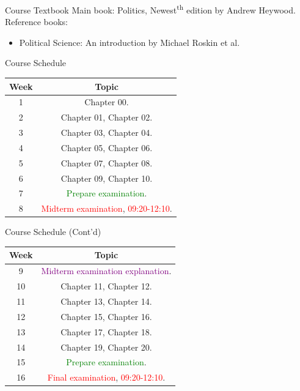 \documentclass{beamer}
\begin{document}
\begin{frame}{Course Textbook}
Main book: Politics, Newest\textsuperscript{th} edition by Andrew Heywood. \\
Reference books:
\begin{itemize}
\item Political Science: An introduction by Michael Roskin et al.
\end{itemize}
\end{frame}
\begin{frame}{Course Schedule}
\begin{center}
\begin{tabular}{|c|c|}
\hline
Week & Topic \\
\hline
1 & Chapter 00.\\
\hline
2 & Chapter 01, Chapter 02.\\
\hline
3 & Chapter 03, Chapter 04.\\
\hline
4 & Chapter 05, Chapter 06.\\
\hline
5 & Chapter 07, Chapter 08.\\
\hline
6 & Chapter 09, Chapter 10.\\
\hline
7 & \textcolor{Green}{Prepare examination}.\\
\hline
8 & \textcolor{red}{Midterm examination}, \textcolor{red}{09:20-12:10}.\\
\hline
\end{tabular}
\end{center}
\end{frame}
\begin{frame}{Course Schedule (Cont'd)}
\begin{center}
\begin{tabular}{|c|c|}
\hline
Week & Topic \\
\hline
9 & \textcolor{purple}{Midterm examination explanation}.\\
\hline
10 & Chapter 11, Chapter 12.\\
\hline
11 & Chapter 13, Chapter 14.\\
\hline
12 & Chapter 15, Chapter 16.\\
\hline
13 & Chapter 17, Chapter 18.\\
\hline
14 & Chapter 19, Chapter 20.\\
\hline
15 & \textcolor{Green}{Prepare examination}.\\
\hline
16 & \textcolor{red}{Final examination}, \textcolor{red}{09:20-12:10}.\\
\hline
\end{tabular}
\end{center}
\end{frame}
\end{document}
